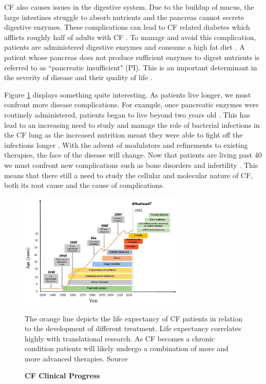 CF also causes issues in the digestive system. Due to the buildup of mucus, the large intestines struggle to absorb nutrients and the pancreas cannot secrete digestive enzymes. These complications can lead to CF related diabetes which afflicts roughly half of adults with CF \cite{Kayani2018}. To manage and avoid this complication, patients are administered digestive enzymes and consume a high fat diet \cite{sullivan2017}. A patient whose pancreas does not produce sufficient enzymes to digest nutrients is referred to as ``pancreatic insufficient" (PI). This is an important determinant in the severity of disease and their quality of life \cite{halloran2011,singh2017}. 

Figure \ref{CF_life_expectancy} displays something quite interesting. As patients live longer, we must confront more disease complications. For example, once pancreatic enzymes were routinely administered, patients began to live beyond two years old \cite{roberts1957, levy2011}. This has lead to an increasing need to study and manage the role of bacterial infections in the CF lung as the increased nutrition meant they were able to fight off the infections longer \cite{burns2001}. With the advent of modulators and refinements to existing therapies, the face of the disease will change. Now that patients are living past 40 we must confront new complications such as bone disorders and infertility \cite{stalvey2013, popli2007}. This means that there still a need to study the cellular and molecular nature of CF, both its root cause and the cause of complications. 


\begin{figure}
	\label{CF_life_expectancy}
	\begin{center}
	\includegraphics[width=0.7\textwidth]{figures/CF_life_expectancy.png}
	\end{center}
	\captionsetup{singlelinecheck = false, justification=raggedright}
	\caption[CF Clinical Progress] {\textbf{CF Clinical Progress}}{The orange line depicts the life expectancy of CF patients in relation to the development of different treatment. Life expectancy correlates highly with translational research. As CF becomes a chronic condition patients will likely undergo a combination of more and more advanced therapies. Source \cite{garcia2022}} 
\end{figure}


